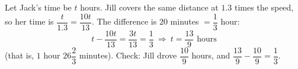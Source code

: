 Let Jack's time be $t$ hours. Jill covers the same distance at $1.3$ times the speed, so her time is $\dfrac{t}{1.3}=\dfrac{10t}{13}$. The difference is $20$ minutes $=\dfrac{1}{3}$ hour:
\[
t-\dfrac{10t}{13}=\dfrac{3t}{13}=\dfrac{1}{3}\ \Longrightarrow\ t=\boxed{\dfrac{13}{9}}\text{ hours}
\]
(that is, $1$ hour $26\dfrac{2}{3}$ minutes). Check: Jill drove $\dfrac{10}{9}$ hours, and $\dfrac{13}{9}-\dfrac{10}{9}=\dfrac{1}{3}$.
